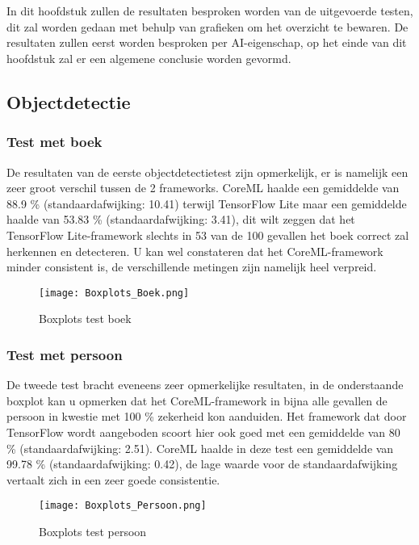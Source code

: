 \chapter{}
\label{ch:resultaten}

In dit hoofdstuk zullen de resultaten besproken worden van de uitgevoerde testen, dit zal worden gedaan met behulp van grafieken om het overzicht te bewaren. De resultaten zullen eerst worden besproken per AI-eigenschap, op het einde van dit hoofdstuk zal er een algemene conclusie worden gevormd.

\section{Objectdetectie}

\subsection{Test met boek}
De resultaten van de eerste objectdetectietest zijn opmerkelijk, er is namelijk een zeer groot verschil tussen de 2 frameworks. CoreML haalde een gemiddelde van 88.9 \% (standaardafwijking: 10.41) terwijl TensorFlow Lite maar een gemiddelde haalde van 53.83 \% (standaardafwijking: 3.41), dit wilt zeggen dat het TensorFlow Lite-framework slechts in 53 van de 100 gevallen het boek correct zal herkennen en detecteren. U kan wel constateren dat het CoreML-framework minder consistent is, de verschillende metingen zijn namelijk heel verpreid.

\begin{figure}[H]
	\centering
	\texttt{[image: Boxplots\_Boek.png]}
	\caption{Boxplots test boek}
\end{figure}
\subsection{Test met persoon}

De tweede test bracht eveneens zeer opmerkelijke resultaten, in de onderstaande boxplot kan u opmerken dat het CoreML-framework in bijna alle gevallen de persoon in kwestie met 100 \% zekerheid kon aanduiden. Het framework dat door TensorFlow wordt aangeboden scoort hier ook goed met een gemiddelde van 80 \% (standaardafwijking: 2.51). CoreML haalde in deze test een gemiddelde van 99.78 \% (standaardafwijking: 0.42), de lage waarde voor de standaardafwijking vertaalt zich in een zeer goede consistentie.
\begin{figure}[H]
	\centering
	\texttt{[image: Boxplots\_Persoon.png]}
	\caption{Boxplots test persoon}
\end{figure}

